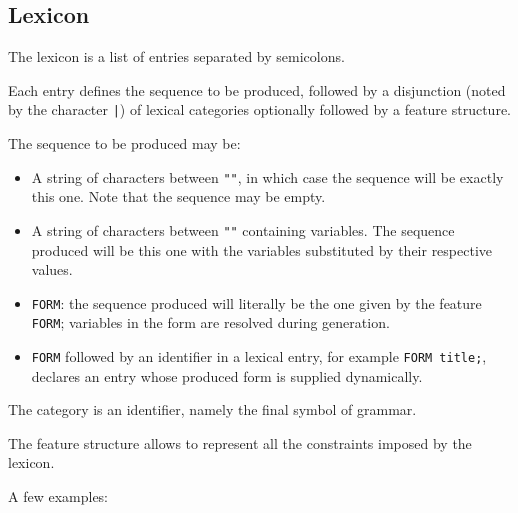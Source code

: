 \documentclass[11pt]{article}
\begin{document}
\subsection{Lexicon}

The lexicon is a list of entries separated by semicolons.

Each entry defines the sequence to be produced, followed by a disjunction
(noted by the character \verb#|#) of lexical categories
optionally followed by a feature structure.

The sequence to be produced may be:

\begin{itemize}
	\item A string of characters between \verb#""#, in which case the sequence
	      will be exactly this one. Note that the sequence may be empty.

	\item A string of characters between \verb#""# containing
	      variables. The sequence produced will be this one with the variables
	      substituted by their respective values.

	\item \texttt{FORM}: the sequence produced will literally be the one
	      given by the feature \texttt{FORM}; variables in the form are resolved
	      during generation.

	\item \texttt{FORM} followed by an identifier in a lexical entry, for
	      example \verb#FORM title;#, declares an entry whose produced form is
	      supplied dynamically.

\end{itemize}

The category is an identifier, namely the final symbol of grammar.

The feature structure allows to represent all the
constraints imposed by the lexicon.

A few examples:
\end{document}
